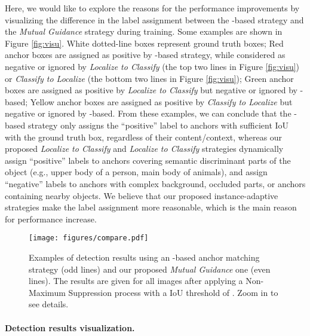 \documentclass[runningheads]{llncs}
\begin{document}
Here, we would like to explore the reasons for the performance improvements by visualizing the difference in the label assignment between the -based strategy and the \emph{Mutual Guidance} strategy during training. Some examples are shown in Figure \ref{fig:visu}. White dotted-line boxes represent ground truth boxes; Red anchor boxes are assigned as positive by -based strategy, while considered as negative or ignored by \emph{Localize to Classify} (the top two lines in Figure \ref{fig:visu}) or \emph{Classify to Localize} (the bottom two lines in Figure \ref{fig:visu}); Green anchor boxes are assigned as positive by \emph{Localize to Classify} but negative or ignored by -based; Yellow anchor boxes are assigned as positive by \emph{Classify to Localize} but negative or ignored by -based.
From these examples, we can conclude that the -based strategy only assigns the ``positive'' label to anchors with sufficient IoU with the ground truth box, regardless of their content/context, whereas our proposed \emph{Localize to Classify} and \emph{Localize to Classify} strategies dynamically assign ``positive'' labels to anchors covering semantic discriminant parts of the object (e.g., upper body of a person, main body of animals), and assign ``negative'' labels to anchors with complex background, occluded parts, or anchors containing nearby objects. We believe that our proposed instance-adaptive strategies make the label assignment more reasonable, which is the main reason for performance increase.

\begin{figure}
\begin{center}
\texttt{[image: figures/compare.pdf]}
\end{center}
   \caption{Examples of detection results using an -based anchor matching strategy (odd lines) and our proposed \emph{Mutual Guidance} one (even lines). 
   The results are given for all images after applying a Non-Maximum Suppression process with a IoU threshold of .
   Zoom in to see details.}
\label{fig:quantitative}
\end{figure}

\paragraph{Detection results visualization.}
\end{document}
